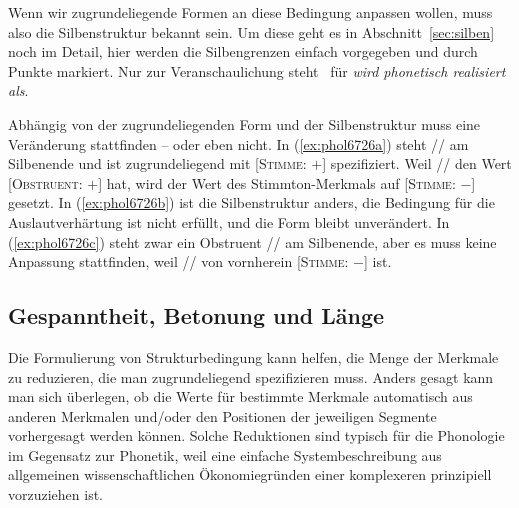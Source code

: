 Wenn wir zugrundeliegende Formen an diese Bedingung anpassen wollen, muss also die Silbenstruktur bekannt sein.
Um diese geht es in Abschnitt~\ref{sec:silben} noch im Detail, hier werden die Silbengrenzen einfach vorgegeben und durch Punkte markiert. 
Nur zur Veranschaulichung steht \phopro\ für \textit{wird phonetisch  realisiert als}.

\begin{exe}
  \ex\label{ex:phol6726}
  \begin{xlist}
  \end{xlist}
\end{exe}

Abhängig von der zugrundeliegenden Form und der Silbenstruktur muss eine Veränderung stattfinden -- oder eben nicht.
In (\ref{ex:phol6726a}) steht // am Silbenende und ist zugrundeliegend mit [\textsc{Stimme}: $+$] spezifiziert.
Weil // den Wert [\textsc{Obstruent}: $+$] hat, wird der Wert des Stimmton-Merkmals auf [\textsc{Stimme}: $-$] gesetzt.
In (\ref{ex:phol6726b}) ist die Silbenstruktur anders, die Bedingung für die Auslautverhärtung ist nicht erfüllt, und die Form bleibt unverändert.
In (\ref{ex:phol6726c}) steht zwar ein Obstruent // am Silbenende, aber es muss keine Anpassung stattfinden, weil // von vornherein [\textsc{Stimme}: $-$] ist.

\subsection{Gespanntheit, Betonung und Länge}

\label{sec:gespanntheit}

Die Formulierung von Strukturbedingung kann helfen, die Menge der Merkmale zu reduzieren, die man zugrundeliegend spezifizieren muss.
Anders gesagt kann man sich überlegen, ob die Werte für bestimmte Merkmale automatisch aus anderen Merkmalen und\slash oder den Positionen der jeweiligen Segmente vorhergesagt werden können.
Solche Reduktionen sind typisch für die Phonologie im Gegensatz zur Phonetik, weil eine einfache Systembeschreibung aus allgemeinen wissenschaftlichen Ökonomiegründen einer komplexeren prinzipiell vorzuziehen ist.

